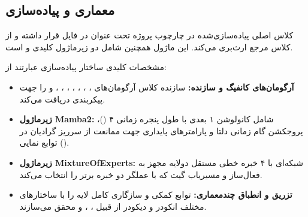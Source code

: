 \subsection{معماری و پیاده‌سازی}
کلاس اصلی پیاده‌سازی‌شده در چارچوب پروژه تحت عنوان  در فایل  قرار داشته و از کلاس مرجع  ارث‌بری می‌کند. این ماژول همچنین شامل دو زیرماژول کلیدی  و  است.

مشخصات کلیدی ساختار پیاده‌سازی عبارتند از:
\begin{itemize}
    \item \textbf{آرگومان‌های کانفیگ و سازنده:} سازنده کلاس آرگومان‌های ، ، ، ، ، ، ،  و  را جهت پیکربندی دریافت می‌کند.
    \item \textbf{زیرماژول Mamba2:} شامل کانولوشن ۱ بعدی با طول پنجره زمانی ۴ ()، پروجکشن گام زمانی دلتا  و پارامترهای پایداری جهت ممانعت از سرریز گرادیان در توابع نمایی ().
    \item \textbf{زیرماژول MixtureOfExperts:} شبکه‌ای با ۴ خبره خطی مستقل دولایه مجهز به فعال‌ساز  و مسیریاب گیت  که با عملگر  دو خبره برتر را انتخاب می‌کند.
    \item \textbf{تزریق و انطباق چندمعماری:} توابع کمکی  و  سازگاری کامل لایه را با ساختارهای مختلف انکودر و دیکودر از قبیل ، ،  و  محقق می‌سازند.
\end{itemize}
